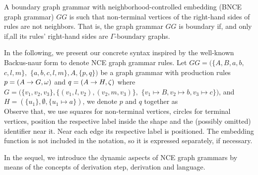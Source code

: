 \documentclass[]{report}
\begin{document}
\begin{definition}
	A boundary graph grammar with neighborhood-controlled embedding (BNCE graph grammar) $GG$ is such that non-terminal vertices of the right-hand sides of rules are not neighbors. That is, the graph grammar $GG$ is boundary if, and only if,all its rules' right-hand sides are $\Gamma\text{-boundary}$ graphs.
\end{definition}

In the following, we present our concrete syntax inspired by the well-known Backus-naur form to denote NCE graph grammar rules. Let $GG = (\{A, B, a, b,$ $ c, l, m\},$ $\{a, b, c, l, m\}, A, \{p,q\})$ be a graph grammar with production rules $p = (A \to G,\omega)$ and $q = (A \to H,\zeta)$ where $G = (\{v_1, v_2, v_3\}, \{(v_1,l,v_2), (v_2,m,v_3)\},$ $\{v_1 \mapsto B, v_2 \mapsto b, v_3 \mapsto c \})$, and $H = (\{u_1\}, \emptyset, \{u_1 \mapsto a\})$, we denote $p$ and $q$ together as\\


Observe that, we use squares for non-terminal vertices, circles for terminal vertices, position the respective label inside the shape and the (possibly omitted) identifier near it. Near each edge its respective label is positioned. The embedding function is not included in the notation, so it is expressed separately, if necessary.


In the sequel, we introduce the dynamic aspects of NCE graph grammars by means of the concepts of derivation step, derivation and language.
\end{document}
